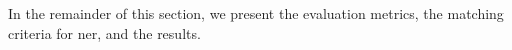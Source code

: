 In the remainder of this section, we present the evaluation metrics, the matching criteria for \ac{ner}, and the results.







%
%
%

